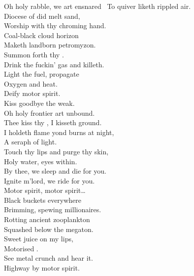 \subtitle{%
    or, Dawn of Eternal Night:
	An Annihilation of Planet Earth and the Beginning of Merciless Damnation \\
}

\label{album:petrodragonic-apocalypse}




Oh holy rabble, we art ensnared \
To quiver liketh rippled air. \\
Diocese of did melt sand, \\
Worship with thy chroming hand. \\
Coal-black cloud horizon \\
Maketh landborn petromyzon. \\
Summon forth thy . \\
Drink the fuckin' gas and killeth. \\

Light the fuel, propagate \\
Oxygen and heat. \\
Deify motor spirit. \\
Kiss goodbye the weak. \\

Oh holy frontier art unbound. \\
Thee kiss thy , I kisseth ground. \\
I holdeth flame yond burns at night, \\
A seraph of  light. \\
Touch thy lips and purge thy skin, \\
Holy water, eyes within. \\
By thee, we sleep and die for you. \\
Ignite m'lord, we ride for you. \\

Motor spirit, motor spirit… \\

Black buckets everywhere \\
Brimming, spewing millionaires. \\
Rotting ancient zooplankton \\
Squashed below the megaton. \\
Sweet juice on my lips, \\
Motorised . \\
See metal crunch and hear it. \\
Highway  by motor spirit. \\

